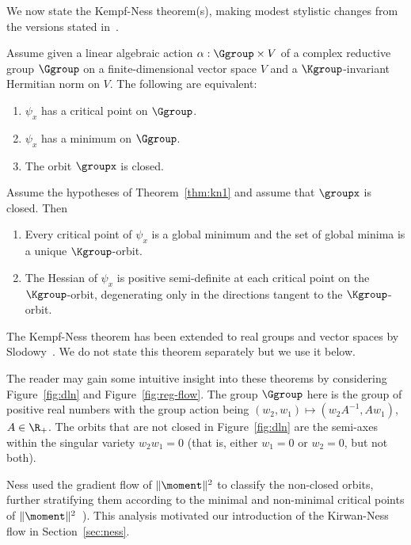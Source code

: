 We now state the Kempf-Ness theorem(s), making modest stylistic changes from the versions stated in~\cite{Helmke,Kempf}.
\begin{theorem}
\label{thm:kn1}
Assume given a linear algebraic action  $\alpha: \Ggroup \times V$ of a complex reductive group $\Ggroup$ on a finite-dimensional vector space $V$ and  a $\Kgroup$-invariant Hermitian norm on $V$. The following are equivalent:
\begin{enumerate}
    \item $\psi_x$ has a critical point on $\Ggroup$.
    \item $\psi_x$ has a minimum on $\Ggroup$.
    \item The orbit $\groupx$ is closed.
\end{enumerate}
\end{theorem}
\begin{theorem}
\label{thm:kn2}
Assume the hypotheses of Theorem~\ref{thm:kn1} and assume that $\groupx$ is closed. Then
\begin{enumerate}
    \item Every critical point of $\psi_x$ is a global minimum and the set of global minima is a unique $\Kgroup$-orbit.
    \item The Hessian of $\psi_x$ is positive semi-definite at each critical point on the $\Kgroup$-orbit, degenerating only in the directions tangent to the $\Kgroup$-orbit.
\end{enumerate}
\end{theorem}
\begin{remark}
 The Kempf-Ness theorem has been extended to real groups and vector spaces by Slodowy~\cite{Slodowy}. We do not state this theorem separately but we use it below.
\end{remark}
\begin{remark}
The reader may gain some intuitive insight into these theorems by considering Figure~\ref{fig:dln} and Figure~\ref{fig:reg-flow}. The group $\Ggroup$ here is the group of positive real numbers with the group action being $(w_2,w_1) \mapsto (w_2 A^{-1},Aw_1)$, $A \in \R_+$. The orbits that are not closed in Figure~\ref{fig:dln} are the semi-axes within the singular variety $w_2w_1=0$ (that is, either $w_1=0$ or $w_2=0$, but not both). %
\end{remark}
\begin{remark}
Ness used the gradient flow of $\|\moment\|^2$ to classify the non-closed orbits, further stratifying them according to the minimal and non-minimal critical points of $\|\moment\|^2$~\cite[Thm 6.2]{Ness}). This analysis motivated our introduction of the Kirwan-Ness flow in Section~\ref{sec:ness}.
\end{remark}

